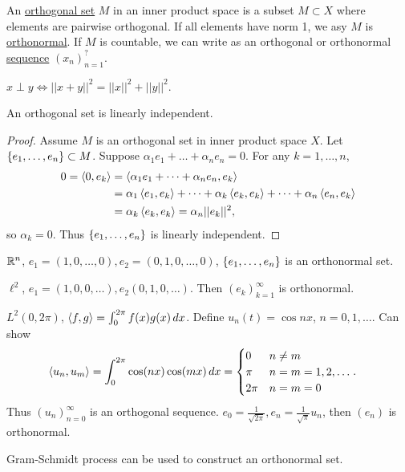 \documentclass[]{article}
\begin{document}
\begin{definition}
	An \ul{orthogonal set} $M$ in an inner product space is a subset $M\subset X$ where elements are pairwise orthogonal.
	If all elements have norm 1, we asy $M$ is \ul{orthonormal}.
	If $M$ is countable, we can write as an orthogonal or orthonormal \ul{sequence} $(x_n)_{n=1}^?$.
\end{definition}
\begin{note}
	$x\perp y \iff ||x+y||^2 = ||x||^2 + ||y||^2$.
\end{note}
\begin{lemma}
	An orthogonal set is linearly independent.
\end{lemma}
\begin{proof}
	Assume $M$ is an orthogonal set in inner product space $X$.
	Let $\left\{ e_1,\dots,e_n \right\} \subset M$. Suppose $\alpha_1e_1+\dots+\alpha_ne_n=0$.
	For any $k=1,\dots,n$,
	\begin{align*} 
		0 = \left\langle 0,e_k \right\rangle &= \left\langle \alpha_1e_1+\dots+\alpha_ne_n,e_k \right\rangle \\
						&= \alpha_1\left\langle e_1,e_k \right\rangle + \dots + \alpha_k\left\langle e_k,e_k \right\rangle + \dots + \alpha_n\left\langle e_n,e_k \right\rangle \\
						&= \alpha_k\left\langle e_k,e_k \right\rangle = \alpha_n||e_k||^2,
	\end{align*}
	so $\alpha_k=0$. Thus $\left\{ e_1,\dots,e_n \right\}$ is linearly independent.
\end{proof}
\begin{example}
	$\mathbb{R}^n$, $e_1=(1,0,\dots,0),e_2=(0,1,0,\dots,0)$, $\left\{ e_1,\dots,e_n \right\}$ is an orthonormal set.
\end{example}
\begin{example}
	$\ell^2$, $e_1=(1,0,0,\dots),e_2(0,1,0,\dots)$.
	Then $(e_k)_{k=1}^\infty$ is orthonormal.
\end{example}
\begin{example}
	$L^2(0,2\pi)$, $\left\langle f,g \right\rangle = \int_0^{2\pi} f(x)g(x)\,dx$.
	Define $u_n(t) = \cos nx$, $n=0,1,\dots$.
	Can show 
	\begin{align*}
		\left\langle u_n,u_m \right\rangle &= \int_0^{2\pi} \cos(nx)\cos(mx)\,dx = \begin{cases} 0 & n\neq m \\ \pi & n=m=1,2,\dots \\ 2\pi & n=m=0 \end{cases}.
	\end{align*}
	Thus $(u_n)_{n=0}^\infty$ is an orthogonal sequence.
	$e_0 = \frac1{\sqrt{2\pi}}, e_n = \frac1{\sqrt\pi}u_n$, then $(e_n)$ is orthonormal.
\end{example}
\begin{remark}
	Gram-Schmidt process can be used to construct an orthonormal set.
\end{remark}
\end{document}
